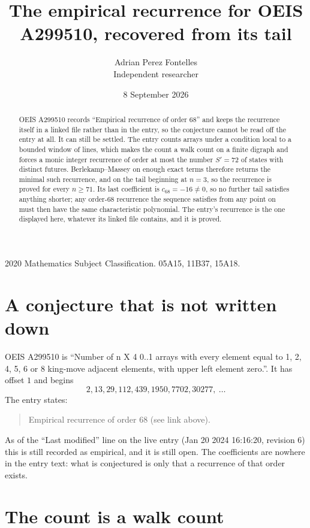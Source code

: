 \documentclass[11pt,a4paper]{article}
\title{The empirical recurrence for OEIS A299510, recovered from its tail}
\author{Adrian Perez Fontelles\\ \small Independent researcher}
\date{8 September 2026}
\theoremstyle{plain}
\theoremstyle{definition}
\begin{document}
\maketitle

\begin{abstract}
OEIS A299510 records ``Empirical recurrence of order $68$'' and keeps the recurrence itself in
a linked file rather than in the entry, so the conjecture cannot be read off the entry at all.
It can still be settled. The entry counts arrays under a condition local to a bounded window of
lines, which makes the count a walk count on a finite digraph and forces a monic integer
recurrence of order at most the number $S'=72$ of states with distinct futures. Berlekamp--Massey on
enough exact terms therefore returns the minimal such recurrence, and on the tail beginning at $n=3$, so the recurrence is proved for every $n\ge71$.
Its last coefficient is $c_{68}=-16\neq0$, so no further tail satisfies anything
shorter; any order-$68$ recurrence the sequence satisfies from any point on must then have
the same characteristic polynomial. The entry's recurrence is the one displayed here, whatever
its linked file contains, and it is proved.
\end{abstract}

\noindent\small 2020 Mathematics Subject Classification. 05A15, 11B37, 15A18.\normalsize

\section{A conjecture that is not written down}

OEIS A299510 is ``Number of n X 4 0..1 arrays with every element equal to 1, 2, 4, 5, 6 or 8 king-move adjacent elements, with upper left element zero.''. It has offset $1$ and begins
\[
2, 13, 29, 112, 439, 1950, 7702, 30277,\ \dots
\]
The entry states:
\begin{quote}
Empirical recurrence of order 68 (see link above).
\end{quote}
As of the ``Last modified'' line on the live entry (Jan 20 2024 16:16:20, revision 6)
this is still recorded as empirical, and it is still open. The coefficients are nowhere in the
entry text: what is conjectured is only that a recurrence of that order exists.

\section{The count is a walk count}
\end{document}
